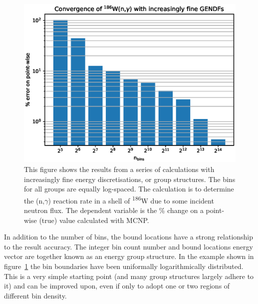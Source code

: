 \begin{figure}[H]
  \centering
  \includegraphics[width=0.9\linewidth]{gendf_convergence}
  \caption[Reaction rate convergence as a function of energy bin count.]{This figure shows the results from a series of calculations with increasingly fine energy discretisations, or group structures. The bins for all groups are equally log-spaced. The calculation is to determine the (n,$\gamma$) reaction rate in a shell of \textsuperscript{186}W due to some incident neutron flux. The dependent variable is the \% change on a point-wise (true) value calculated with MCNP.}
  \label{fig:gendf_convergence}
\end{figure}

In addition to the number of bins, the bound locations have a strong relationship to the result accuracy. The integer bin count number and bound locations energy vector are together known as an energy group structure. In the example shown in figure~\ref{fig:gendf_convergence} the bin boundaries have been uniformally logarithmically distributed. This is a very simple starting point (and many group structures largely adhere to it) and can be improved upon, even if only to adopt one or two regions of different bin density.

